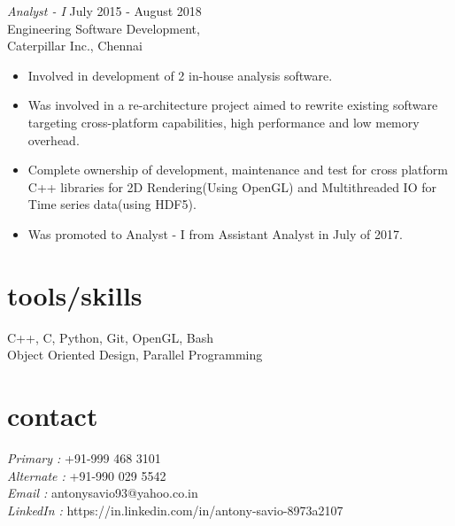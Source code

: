 \documentclass[margin]{res}
\begin{document}
\begin{resume}
                {\sl Analyst - I} \hfill July 2015 - August 2018\\
                Engineering Software Development,\\
                Caterpillar Inc., Chennai 
                 \begin{itemize}  \itemsep -2pt 
                 \item Involved in development of 2 in-house analysis software. 
                 \item Was involved in a re-architecture project aimed to rewrite existing software targeting cross-platform capabilities, high performance and low memory overhead.
                 \item Complete ownership of development, maintenance and test for cross platform C++ libraries for 2D Rendering(Using OpenGL) and Multithreaded IO for Time series data(using HDF5).
                 \item Was promoted to Analyst - I from Assistant Analyst in July of 2017.
                \end{itemize}
                
        
		
\section{tools/skills}  C++, C, Python, Git, OpenGL, Bash\\
                        Object Oriented Design, Parallel Programming
            
\section{contact}
	   {\sl Primary :}
	   +91-999 468 3101 \\
	   {\sl Alternate :}
	   +91-990 029 5542 \\
	   {\sl Email :}
	   antonysavio93@yahoo.co.in \\
	   {\sl LinkedIn :}
	   https://in.linkedin.com/in/antony-savio-8973a2107 \\ 

\end{resume}
\end{document}
